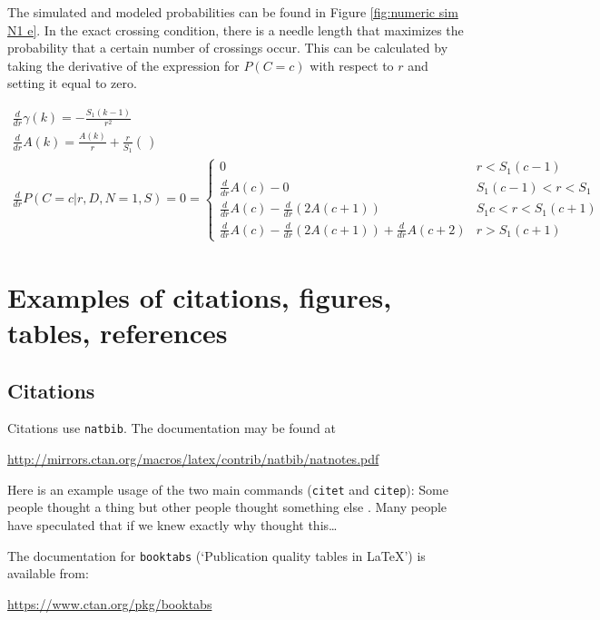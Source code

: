 \documentclass{article}
\begin{document}
The simulated and modeled probabilities can be found in Figure \ref{fig:numeric sim N1 e}. In the exact
crossing condition, there is a needle length that maximizes the probability that a certain number of crossings
occur. This can be calculated by taking the derivative of the expression for $P(C=c)$ with respect to $r$
and setting it equal to zero.

\begin{gather}
	\frac{d}{dr}\gamma(k) = -\frac{S_1(k-1)}{r^2} \\
	\frac{d}{dr}A(k) = \frac{A(k)}{r}+\frac{r}{S_1}\left( \frac{}{} \right) \\
	\frac{d}{dr}P(C=c|r,D,N=1,S) = 0 = \begin{cases}
		0 & r<S_1(c-1) \\
		\frac{d}{dr}A(c) - 0 & S_1(c-1) < r < S_1 \\
		\frac{d}{dr}A(c) - \frac{d}{dr}(2A(c+1)) & S_1c<r<S_1(c+1) \\
		\frac{d}{dr}A(c) - \frac{d}{dr}(2A(c+1)) + \frac{d}{dr}A(c+2) & r>S_1(c+1)
	\end{cases}
\end{gather}

\section{Examples of citations, figures, tables, references}
\label{sec:others}

\subsection{Citations}
Citations use \verb+natbib+. The documentation may be found at
\begin{center}
	\url{http://mirrors.ctan.org/macros/latex/contrib/natbib/natnotes.pdf}
\end{center}

Here is an example usage of the two main commands (\verb+citet+ and \verb+citep+): Some people thought a
thing \citep{kour2014real, hadash2018estimate} but other people thought something else \citep{kour2014fast}. 
Many people have speculated that if we knew exactly why \citet{kour2014fast} thought this\dots


The documentation for \verb+booktabs+ (`Publication quality tables in LaTeX') is available from:
\begin{center}
	\url{https://www.ctan.org/pkg/booktabs}
\end{center}
\end{document}
